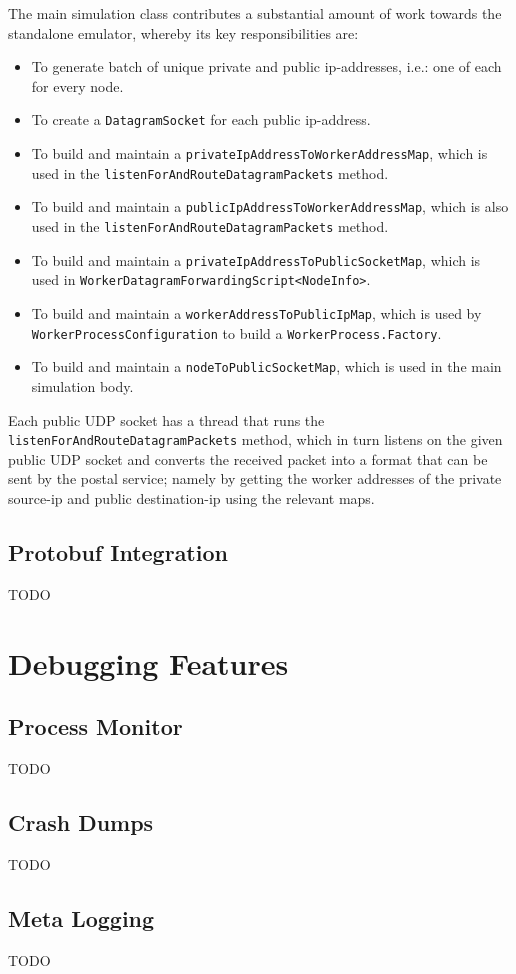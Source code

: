 The main simulation class contributes a substantial amount of work towards the standalone emulator, whereby its key
responsibilities are:
\begin{itemize}
    \item To generate batch of unique private and public ip-addresses, i.e.: one of each for every node.
    \item To create a \texttt{DatagramSocket}\cite{java_DatagramSocket} for each public ip-address.
    \item To build and maintain a \texttt{privateIpAddressToWorkerAddressMap}, which is used in the
    \texttt{listenForAndRouteDatagramPackets} method.
    \item To build and maintain a \texttt{publicIpAddressToWorkerAddressMap}, which is also used in the
    \texttt{listenForAndRouteDatagramPackets} method.
    \item To build and maintain a \texttt{privateIpAddressToPublicSocketMap}, which is used in
    \texttt{WorkerDatagramForwardingScript<NodeInfo>}.
    \item To build and maintain a \texttt{workerAddressToPublicIpMap}, which is used by
    \texttt{WorkerProcessConfiguration} to build a \texttt{WorkerProcess.Factory}.
    \item To build and maintain a \texttt{nodeToPublicSocketMap}, which is used in the main simulation body.
\end{itemize}

Each public UDP socket has a thread that runs the \texttt{listenForAndRouteDatagramPackets} method, which in turn
listens on the given public UDP socket and converts the received packet into a format that can be sent by the postal
service; namely by getting the worker addresses of the private source-ip and public destination-ip using the relevant
maps.

\subsection{Protobuf Integration}

TODO


\section{Debugging Features}

\subsection{Process Monitor}

TODO

\subsection{Crash Dumps}

TODO

\subsection{Meta Logging}

TODO
